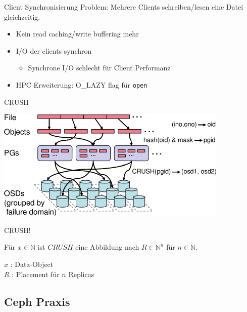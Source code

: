 \documentclass[hyperref={xetex}]{beamer}
\begin{document}
\begin{frame}{Client Synchronisierung}
  \alert{Problem:} Mehrere Clients schreiben/lesen eine Datei gleichzeitig.

	\begin{itemize}	
		\item Kein read caching/write buffering mehr
		\item I/O der clients synchron %
			\begin{itemize}
				\item Synchrone I/O schlecht f\"ur Client Performanz
			\end{itemize}
		\item HPC Erweiterung: O\_LAZY flag f\"ur \texttt{open}
	\end{itemize}
\end{frame}


\begin{frame}{CRUSH}
	\begin{center}
	\includegraphics{images/crush.pdf}
\end{center}
\end{frame}

\begin{frame}{CRUSH!}

Für $x \in \mathbb{N}$ ist $CRUSH$ eine Abbildung nach $R \in \mathbb{N}^n$ für $n  \in \mathbb{N}$.

$x$ : Data-Object\\
$R$ : Placement für $n$ Replicas
 
\end{frame}

\subsection{Ceph Praxis}
\end{document}
